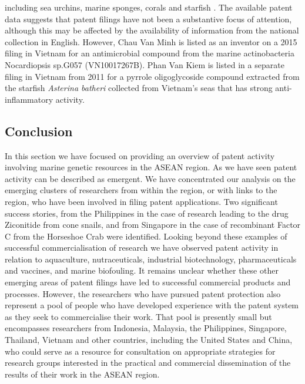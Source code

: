 \documentclass[]{book}
\theoremstyle{definition}
\theoremstyle{definition}
\theoremstyle{definition}
\theoremstyle{remark}
\begin{document}
\begin{enumerate}
  including sea urchins, marine sponges, corals and starfish
  \citep{Thao_2015, Thao_2015a, Kiem_2017, Ngoc_2017, Vien_2016}. The
  available patent data suggests that patent filings have not been a
  substantive focus of attention, although this may be affected by the
  availability of information from the national collection in English.
  However, Chau Van Minh is listed as an inventor on a 2015 filing in
  Vietnam for an antimicrobial compound from the marine actinobacteria
  Nocardiopsis sp.G057 (VN10017267B). Phan Van Kiem is listed in a
  separate filing in Vietnam from 2011 for a pyrrole oligoglycoside
  compound extracted from the starfish \emph{Asterina batheri} collected
  from Vietnam's seas that has strong anti-inflammatory activity.
\end{enumerate}

\hypertarget{conclusion-2}{%
\subsection{Conclusion}\label{conclusion-2}}

In this section we have focused on providing an overview of patent
activity involving marine genetic resources in the ASEAN region. As we
have seen patent activity can be described as emergent. We have
concentrated our analysis on the emerging clusters of researchers from
within the region, or with links to the region, who have been involved
in filing patent applications. Two significant success stories, from the
Philippines in the case of research leading to the drug Ziconitide from
cone snails, and from Singapore in the case of recombinant Factor C from
the Horseshoe Crab were identified. Looking beyond these examples of
successful commercialisation of research we have observed patent
activity in relation to aquaculture, nutraceuticals, industrial
biotechnology, pharmaceuticals and vaccines, and marine biofouling. It
remains unclear whether these other emerging areas of patent filings
have led to successful commercial products and processes. However, the
researchers who have pursued patent protection also represent a pool of
people who have developed experience with the patent system as they seek
to commercialise their work. That pool is presently small but
encompasses researchers from Indonesia, Malaysia, the Philippines,
Singapore, Thailand, Vietnam and other countries, including the United
States and China, who could serve as a resource for consultation on
appropriate strategies for research groups interested in the practical
and commercial dissemination of the results of their work in the ASEAN
region.
\end{document}
